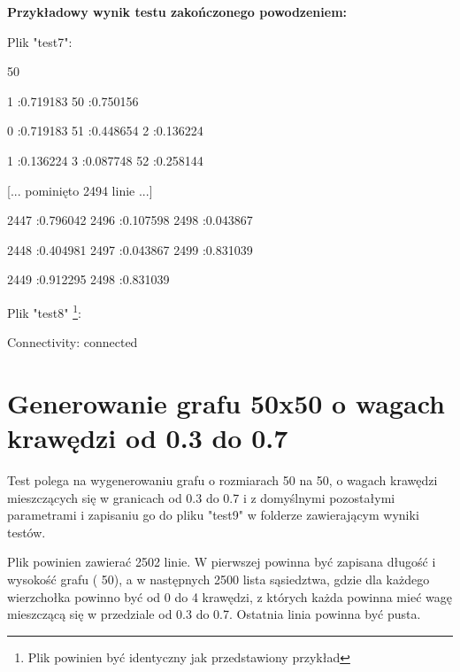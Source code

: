 \documentclass[11pt,a4paper]{report}
\def\console #1{\begingroup\fontfamily{qcr}\selectfont#1\endgroup}
\newenvironment{multiconsole}{\begingroup\fontfamily{qcr}\selectfont}{\endgroup}
\begin{document}
    \vspace{2em}

    \textbf{Przykładowy wynik testu zakończonego powodzeniem:}

    \vspace{1em}

    Plik "test7":

    \begin{multiconsole}
        50 50

        \hspace{2em}1 :0.719183  50 :0.750156 

        \hspace{2em}0 :0.719183  51 :0.448654  2 :0.136224

        \hspace{2em}1 :0.136224  3 :0.087748  52 :0.258144

        [... pominięto 2494 linie ...]

        \hspace{2em}2447 :0.796042  2496 :0.107598  2498 :0.043867

        \hspace{2em}2448 :0.404981  2497 :0.043867  2499 :0.831039

        \hspace{2em}2449 :0.912295  2498 :0.831039
    \end{multiconsole}

    \vspace{1em}

    Plik "test8" \footnote{Plik powinien być identyczny jak przedstawiony przykład}:

    \begin{multiconsole}
        Connectivity: connected
    \end{multiconsole}


    \newpage
    \section{Generowanie grafu 50x50 o wagach krawędzi od 0.3 do 0.7}

    Test polega na wygenerowaniu grafu o rozmiarach 50 na 50, o wagach krawędzi mieszczących się w granicach od 0.3 do 0.7 i z domyślnymi pozostałymi parametrami i zapisaniu go do pliku "test9" w folderze zawierającym wyniki testów. 
    
    Plik powinien zawierać 2502 linie. W pierwszej powinna być zapisana długość i wysokość grafu (\console{50 50}), a w następnych 2500 lista sąsiedztwa, gdzie dla każdego wierzchołka powinno być od 0 do 4 krawędzi, z których każda powinna mieć wagę mieszczącą się w przedziale od 0.3 do 0.7. Ostatnia linia powinna być pusta.
\end{document}

